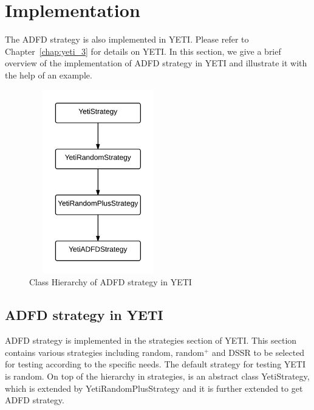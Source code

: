 \section{Implementation}\label{sec:implementation}
The ADFD strategy is also implemented in YETI. Please refer to Chapter~\ref{chap:yeti_3} for details on YETI. In this section, we give a brief overview of the implementation of ADFD strategy in YETI and illustrate it with the help of an example. 
\bigskip
\begin{figure}[h]
\centering
\includegraphics[width=6cm,height=8cm]{chapter5/classHierarchy2.png}
\caption{Class Hierarchy of ADFD strategy in YETI}
\label{fig:hierarchyofADFD}
\end{figure}

 
 \subsection{ADFD strategy in YETI}
ADFD strategy is implemented in the strategies section of YETI. This section contains various strategies including random, random$^+$ and DSSR to be selected for testing according to the specific needs. The default strategy for testing YETI is random. On top of the hierarchy in strategies, is an abstract class YetiStrategy, which is extended by YetiRandomPlusStrategy and it is further extended to get ADFD strategy.



